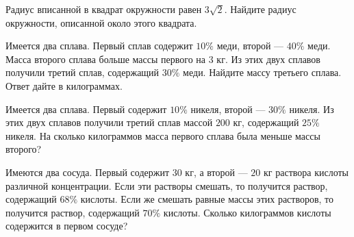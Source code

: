 \begin{class}[number=7]
\begin{listofex}
		\item Радиус вписанной в квадрат окружности равен \(3 \sqrt{2}\). Найдите радиус окружности, описанной около этого квадрата.
		\item Имеется два сплава. Первый сплав содержит \(10\%\) меди, второй --- \(40\%\) меди. Масса второго сплава больше массы первого на \(3\) кг. Из этих двух сплавов получили третий сплав, содержащий \(30\%\) меди. Найдите массу третьего сплава. Ответ дайте в килограммах.
		\item Имеется два сплава. Первый содержит \(10\%\) никеля, второй --- \(30\%\) никеля. Из этих двух сплавов получили третий сплав массой \(200\) кг, содержащий \(25\%\) никеля. На сколько килограммов масса первого сплава была меньше массы второго?
		\item Имеются два сосуда. Первый содержит \(30\) кг, а второй --- \(20\) кг раствора кислоты различной концентрации. Если эти растворы смешать, то получится раствор, содержащий \(68\%\) кислоты. Если же смешать равные массы этих растворов, то получится раствор, содержащий \(70\%\) кислоты. Сколько килограммов кислоты содержится в первом сосуде?
		
	\end{listofex}
\end{class}

